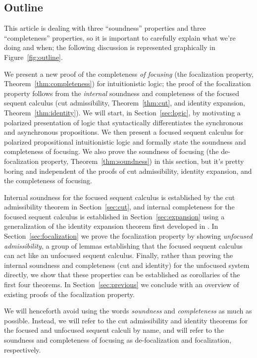 \documentclass[acmtocl]{robtrans}\pdfoutput=1
\begin{document}
\subsection{Outline}

This article is dealing with three ``soundness'' properties and three
``completeness'' properties, so it is important to carefully 
explain what we're doing and when; the following discussion is represented
graphically in Figure~\ref{fig:outline}.

We present a new proof of the completeness {\it of focusing} (the
focalization property, Theorem~\ref{thm:completeness}) for
intuitionistic logic; the proof of the focalization property follows
from the {\it internal} soundness and completeness of the focused
sequent calculus (cut admissibility, Theorem~\ref{thm:cut}, and
identity expansion, Theorem~\ref{thm:identity}).  We will start, in
Section~\ref{sec:logic}, by motivating a polarized presentation of
logic that syntactically differentiates the synchronous and
asynchronous propositions. We then present a focused sequent calculus
for polarized propositional intuitionistic logic and formally state
the soundness and completeness of focusing. We also prove the
soundness of focusing (the de-focalization property,
Theorem~\ref{thm:soundness}) in this section, but it's pretty boring
and independent of the proofs of cut admissibility, identity
expansion, and the completeness of focusing.

Internal soundness for the focused sequent calculus is established by
the cut admissibility theorem in Section~\ref{sec:cut}, and internal
completeness for the focused sequent calculus is established in
Section~\ref{sec:expansion} using a generalization of the identity
expansion theorem first developed in \cite{simmons11weak}. In
Section~\ref{sec:focalization} we prove the focalization property by
showing {\it unfocused admissibility}, a group of lemmas establishing
that the focused sequent calculus can act like an unfocused sequent
calculus.  Finally, rather than proving the internal soundness and
completeness (cut and identity) for the unfocused system directly, we
show that these properties can be established as corollaries of the
first four theorems.  In Section~\ref{sec:previous} we conclude with
an overview of existing proofs of the focalization property.


We will henceforth avoid using 
the words {\it soundness} and {\it completeness} as much as possible. 
Instead, we will refer
to the cut admissibility and identity theorems 
for the focused and unfocused sequent calculi by name, and will refer
to the soundness and completeness of focusing as de-focalization 
and focalization, respectively.
\end{document}
